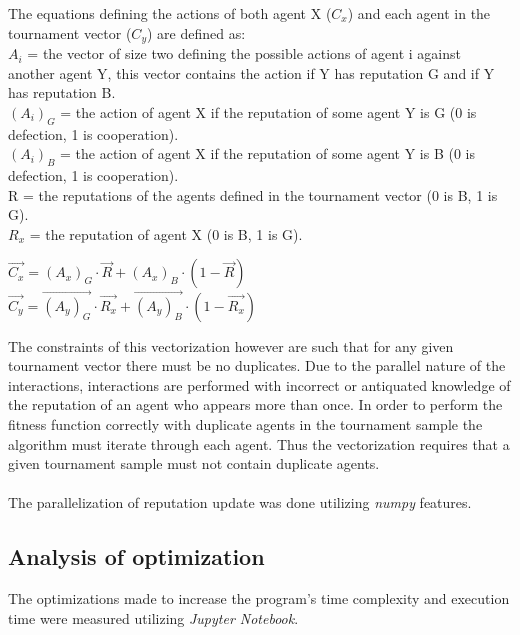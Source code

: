\documentclass[10pt,a4paper]{article}
\begin{document}
The equations defining the actions of both agent X (\emph{$C_{x}$}) and each agent in the tournament vector (\emph{$C_{y}$}) are defined as:\\
$A_{i}$ = the vector of size two defining the possible actions of agent i against another agent Y, this vector contains the action if Y has reputation G and if Y has reputation B.\\
$(A_{i})_{G}$ = the action of agent X if the reputation of some agent Y is G (0 is defection, 1 is cooperation). \\
$(A_{i})_{B}$ = the action of agent X if the reputation of some agent Y is B (0 is defection, 1 is cooperation). \\
R = the reputations of the agents defined in the tournament vector (0 is B, 1 is G). \\
$R_{x}$ = the reputation of agent X (0 is B, 1 is G). 
\begin{center}
$\overrightarrow{C_{x}} = (A_{x})_{G} \cdot \overrightarrow{R} + (A_{x})_{B} \cdot (1 - \overrightarrow{R})$
\\
$\overrightarrow{C_{y}} = \overrightarrow{(A_{y})_{G}} \cdot \overrightarrow{R_{x}} + \overrightarrow{(A_{y})_{B}} \cdot (1 - \overrightarrow{R_{x}})$
\end{center}

The constraints of this vectorization however are such that for any given tournament vector there must be no duplicates.
Due to the parallel nature of the interactions, interactions are performed with incorrect or antiquated knowledge of the reputation of an agent who appears more than once.
In order to perform the fitness function correctly with duplicate agents in the tournament sample the algorithm must iterate through each agent.
Thus the vectorization requires that a given tournament sample must not contain duplicate agents.
\\\\
The parallelization of reputation update was done utilizing \emph{numpy} features.

\subsection{Analysis of optimization}
The optimizations made to increase the program's time complexity and execution time were measured utilizing \emph{Jupyter Notebook}.

\end{document}

